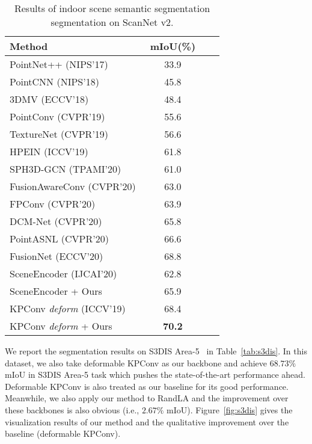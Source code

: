 \documentclass[final]{cvpr}
\begin{document}
\begin{table}
\centering
\begin{tabular}{lccc}  
\toprule
Method  & mIoU(\%) \\
\midrule
PointNet++ ({\color{blue}NIPS'17})~\cite{qi2017pointnet++} & 33.9 \\
PointCNN ({\color{blue}NIPS'18})~\cite{li2018pointcnn} & 45.8 \\
3DMV ({\color{blue}ECCV'18})~\cite{dai20183dmv} &48.4 \\ 
PointConv ({\color{blue}CVPR'19})~\cite{wu2019pointconv} & 55.6\\
TextureNet ({\color{blue}CVPR'19})~\cite{huang2019texturenet} & 56.6 \\
HPEIN ({\color{blue}ICCV'19})~\cite{jiang2019hierarchical} &61.8\\
SPH3D-GCN ({\color{blue}TPAMI'20})~\cite{lei2020spherical} & 61.0\\
FusionAwareConv ({\color{blue}CVPR'20})~\cite{zhang2020fusion} & 63.0 \\ 
FPConv ({\color{blue}CVPR'20})~\cite{lin2020fpconv} & 63.9\\
DCM-Net ({\color{blue}CVPR'20})~\cite{Schult_2020_CVPR} & 65.8 \\
PointASNL ({\color{blue}CVPR'20})~\cite{yan2020pointasnl} & 66.6 \\
FusionNet ({\color{blue}ECCV'20})~\cite{zhang2020deep} & 68.8\\
\midrule
SceneEncoder ({\color{blue}IJCAI'20})~\cite{xu2020sceneencoder} & 62.8\\
SceneEncoder + Ours & 65.9\\
\midrule
KPConv \textit{deform} ({\color{blue}ICCV'19})~\cite{thomas2019kpconv} & 68.4 \\
KPConv \textit{deform} + Ours & \textbf{70.2}\\
\bottomrule
\end{tabular}
\caption{Results of indoor scene semantic segmentation segmentation on ScanNet v2.}
\label{tab:scannet}
\end{table}



We report the segmentation results on S3DIS Area-5~\cite{armeni20163d} in Table~\ref{tab:s3dis}. In this dataset, we also take deformable KPConv as our backbone and achieve $68.73\%$ mIoU in S3DIS Area-5 task which pushes the state-of-the-art performance ahead. Deformable KPConv is also treated as our baseline for its good performance. Meanwhile, we also apply our method to RandLA and the improvement over these backbones is also obvious (i.e., $2.67\%$ mIoU). Figure~\ref{fig:s3dis} gives the visualization results of our method and the qualitative improvement over the baseline (deformable KPConv).
\end{document}
